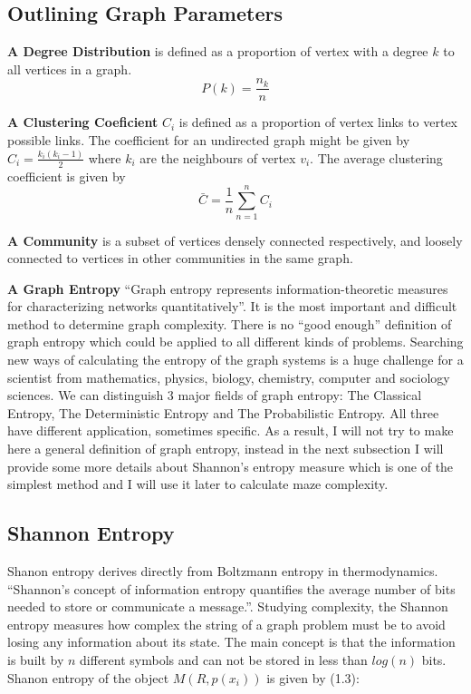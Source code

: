 \subsection{Outlining Graph Parameters}
\begin{definition}\textbf{A Degree Distribution} is defined as a proportion of vertex with a degree $k$ to all vertices in a graph.
\begin{equation}
P(k) = \frac{n_k}{n}
\end{equation}
\end{definition}
\begin{definition}\textbf{A Clustering Coeficient} $C_i$ is defined as a proportion of vertex links to vertex possible links. The coefficient for an undirected graph might be given by $C_i = \frac{k_i(k_i-1)}{2}$ where $k_i$ are the neighbours of vertex $v_i$. The average clustering coefficient is given by
\begin{equation}
\bar{C} = \frac{1}{n}\sum_{n = 1}^{n} C_i
\end{equation}
\end{definition}
\begin{definition}\textbf{A Community} is a subset of vertices densely connected respectively, and loosely connected to vertices in other communities in the same graph.\end{definition}
\begin{definition}\textbf{A Graph Entropy} “Graph entropy represents information-theoretic measures for characterizing networks quantitatively”\cite{MaDehm}. It is the most important and difficult method to determine graph complexity. There is no “good enough” definition of graph entropy which could be applied to all different kinds of problems. Searching new ways of calculating the entropy of the graph systems is a huge challenge for a scientist from mathematics, physics, biology, chemistry, computer and sociology sciences. We can distinguish 3 major fields of graph entropy: The Classical Entropy, The Deterministic Entropy and The Probabilistic Entropy. All three have different application, sometimes specific. As a result, I will not try to make here a general definition of graph entropy, instead in the next subsection I will provide some more details about Shannon’s entropy measure which is one of the simplest method and I will use it later to calculate maze complexity. \end{definition}
\subsection{Shannon Entropy}
Shanon entropy derives directly from Boltzmann entropy in thermodynamics. “Shannon’s concept of information entropy quantifies the average number of bits needed to store or communicate a message.”\cite{HeZeni}. Studying complexity, the Shannon entropy measures how complex the string of a graph problem must be to avoid losing any information about its state. The main concept is that the information is built by $n$ different symbols and can not be stored in less than $log(n)$ bits.
Shanon entropy of the object $M(R, p(x_i))$ is given by (1.3)\cite{HeZeni}:

